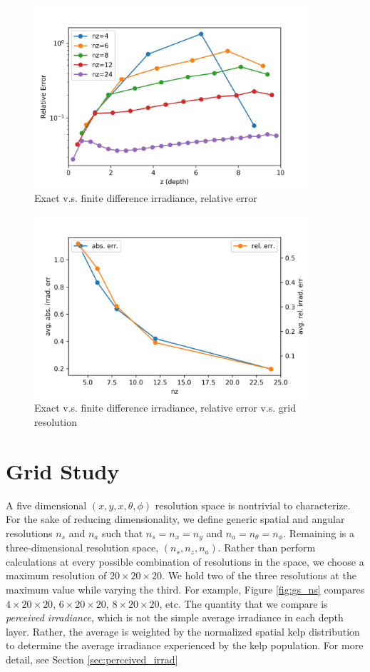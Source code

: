 \documentclass[ms,cpyr,lof,lot]{uathesis}
\begin{document}
\begin{figure}[H]
  \centering
  \includegraphics[width=4in]{exact_vs_fd_rel_err}
  \caption{Exact v.s. finite difference irradiance, relative error}
\end{figure}

\begin{figure}[H]
  \centering
  \includegraphics[width=4in]{exact_vs_fd_compare}
  \caption{Exact v.s. finite difference irradiance, relative error v.s. grid resolution}
\end{figure}

\section{Grid Study}
A five dimensional $(x,y,x,\theta,\phi)$ resolution space is nontrivial to characterize.
For the sake of reducing dimensionality, we define generic spatial and angular resolutions
$n_s$ and $n_a$ such that $n_s=n_x=n_y$ and $n_a=n_\theta=n_\phi$.
Remaining is a three-dimensional resolution space, $(n_s,n_z,n_a)$.
Rather than perform calculations at every possible combination of resolutions in the space,
we choose a maximum resolution of $20 \times 20 \times 20$.
We hold two of the three resolutions at the maximum value while varying the third.
For example, Figure \ref{fig:gs_ns} compares $4 \times 20 \times 20$, $6 \times 20 \times 20$, $8 \times 20 \times 20$, etc.
The quantity that we compare is \textit{perceived irradiance}, which is not the simple average irradiance in each depth layer.
Rather, the average is weighted by the normalized spatial kelp distribution to determine the average irradiance experienced by the kelp population.
For more detail, see Section \ref{sec:perceived_irrad}
\end{document}
